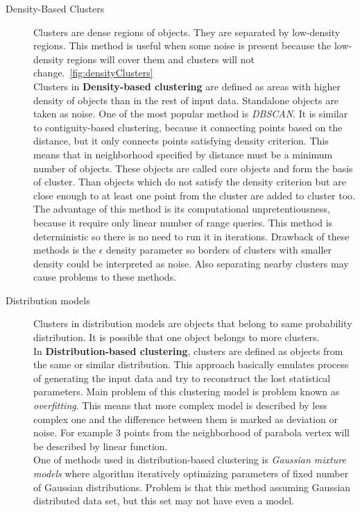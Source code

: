 \begin{description}
\item[Density-Based Clusters] Clusters are dense regions of objects. They are separated by low-density regions. This method is useful when some noise is present because the low-density regions will cover them and clusters will not change.~\autoref{fig:densityClusters} \\
Clusters in \textbf{Density-based clustering} are defined as areas with higher density of objects than in the rest of input data. Standalone objects are taken as noise. One of the most popular method is \textit{DBSCAN}. It is similar to contiguity-based clustering, because it connecting points based on the distance, but it only connects points satisfying density criterion. This means that in neighborhood specified by distance must be a minimum number of objects. These objects are called core objects and form the basis of cluster. Than objects which do not satisfy the density criterion but are close enough to at least one point from the cluster are added to cluster too.\\
The advantage of this method is its computational unpretentiousness, because it require only linear number of range queries. This method is deterministic so there is no need to run it in iterations.
Drawback of these methods is the $\epsilon$ density parameter so borders of clusters with smaller density could be interpreted as  noise. Also separating nearby clusters may cause problems to these methods.

\item[Distribution models] Clusters in distribution models are objects that belong to same probability distribution. It is possible that one object belongs to more clusters.\\
In \textbf{Distribution-based clustering}, clusters are defined as objects from the same or similar distribution. This approach basically emulates process of generating the input data and try to reconstruct the lost statistical parameters. Main problem of this clustering model is problem known as \textit{overfitting}. This means that more complex model is described by less complex one and the difference between them is marked as deviation or noise. For example 3 points from the neighborhood of parabola vertex will be described by linear function.\\
One of methods used in distribution-based clustering is \textit{Gaussian mixture models} where algorithm iteratively optimizing parameters of fixed number of Gaussian distributions.
Problem is that this method assuming Gaussian distributed data set, but this set may not have even a model.


\end{description}
